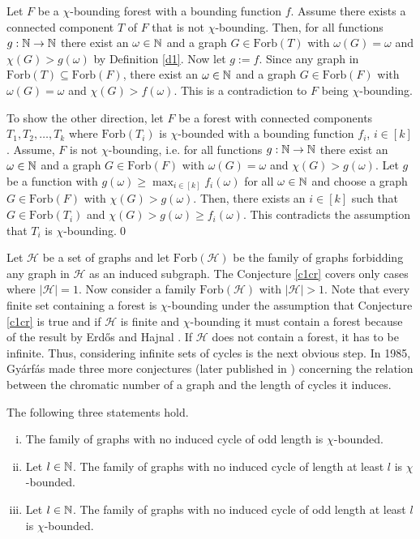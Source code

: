 \begin{prf}
Let $F$ be a $\chi$-bounding forest with a bounding function $f$. Assume there exists a connected component $T$ of $F$ that is not $\chi$-bounding. Then, for all functions $g:\mathbb{N}\to\mathbb{N}$ there exist an $\omega\in\mathbb{N}$ and a graph $G\in \text{Forb}(T)$ with $\omega (G)=\omega$ and $\chi (G)>g(\omega)$ by Definition \ref{d1}. Now let $g:=f$. Since any graph in $\text{Forb}(T)\subseteq\text{Forb}(F)$, there exist an $\omega\in\mathbb{N}$ and a graph $G\in\text{Forb}(F)$ with $\omega (G) =\omega $ and $\chi (G)>f(\omega )$. This is a contradiction to $F$ being $\chi$-bounding.

To show the other direction, let $F$ be a forest with connected components $T_1, T_2,\dots ,T_k$ where $\text{Forb}(T_i)$ is $\chi$-bounded with a bounding function $f_i$, $i\in [k]$. Assume, $F$ is not $\chi$-bounding, i.e. for all functions $g:\mathbb{N}\to\mathbb{N}$ there exist an $\omega\in\mathbb{N}$ and a graph $G\in \text{Forb}(F)$ with $\omega (G)=\omega$ and $\chi (G)>g(\omega)$. Let $g$ be a function with $g(\omega )\geq\max_{i\in [k]}f_i(\omega )$ for all $\omega\in\mathbb{N}$ and choose a graph $G\in\text{Forb}(F)$ with $\chi (G)>g(\omega)$. Then, there exists an $i\in [k]$ such that $G\in\text{Forb}(T_i)$ and $\chi (G)>g(\omega )\geq f_i(\omega )$. This contradicts the assumption that $T_i$ is $\chi$-bounding.\qed
\end{prf}

Let $\mathcal{H}$ be a set of graphs and let $\text{Forb}(\mathcal{H})$ be the family of graphs forbidding any graph in $\mathcal{H}$ as an induced subgraph. The Conjecture \ref{c1cr} covers only cases where $\vert\mathcal{H}\vert =1$.
Now consider a family $\text{Forb}(\mathcal{H})$ with $\vert\mathcal{H}\vert >1$. Note that every finite set containing a forest is $\chi$-bounding under the assumption that Conjecture \ref{c1cr} is true and if $\mathcal{H}$ is finite and $\chi$-bounding it must contain a forest because of the result by Erd\H{o}s and Hajnal \cite{EH66}. If $\mathcal{H}$ does not contain a forest, it has to be infinite. Thus, considering infinite sets of cycles is the next obvious step. In 1985, Gyárfás made three more conjectures (later published in \cite{Gy87}) concerning the relation between the chromatic number of a graph and the length of cycles it induces.
\begin{con}
The following three statements hold.
\begin{enumerate}[(i)]
\item The family of graphs with no induced cycle of odd length is $\chi$-bounded.
\item Let $l\in\mathbb{N}$. The family of graphs with no induced cycle of length at least $l$ is $\chi$-bounded.
\item Let $l\in\mathbb{N}$. The family of graphs with no induced cycle of odd length at least $l$ is $\chi$-bounded.
\end{enumerate}
\end{con}

